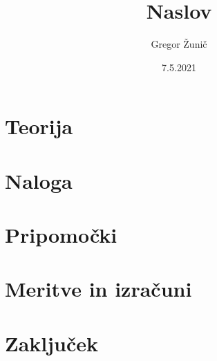 \documentclass[12pt,a4paper]{article}
\title{\bf{Naslov}}
\author{Gregor Žunič}
\date{7.5.2021}
\begin{document}
\maketitle
\newpage

\newpage
\section{Teorija}
\label{sec: teorija}


\section{Naloga}
\label{sec: naloga}


\section{Pripomočki}
\label{sec: pripomocki}


\section{Meritve in izračuni}
\label{sec: meritve}


\section{Zaključek}
\end{document}
